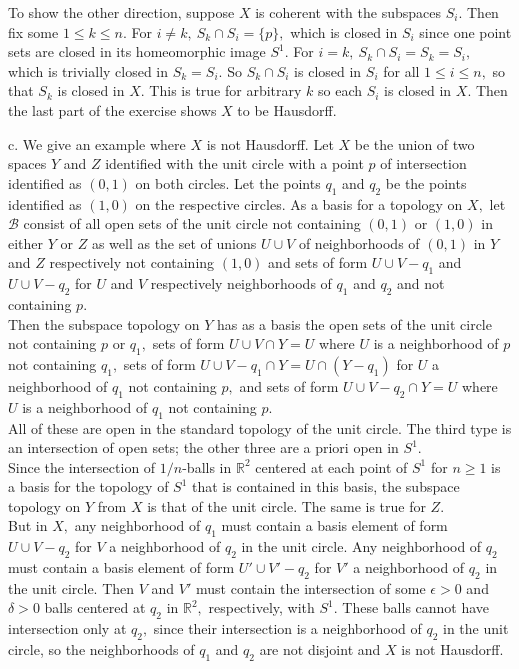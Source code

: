 \documentclass{article}
\begin{document}
To show the other direction, suppose $X$ is coherent with the subspaces $S_i.$  Then fix some $1\le k\le n.$  For $i\ne k,\ S_k\cap S_i=\{p\},$ which is closed in $S_i$ since one point sets are closed in its homeomorphic image $S^1.$  For $i=k,\ S_k\cap S_i=S_k=S_i,$ which is trivially closed in $S_k=S_i.$  So $S_k\cap S_i$ is closed in $S_i$ for all $1\le i\le n,$ so that $S_k$ is closed in $X.$  This is true for arbitrary $k$ so each $S_i$ is closed in $X.$  Then the last part of the exercise shows $X$ to be Hausdorff.

c. We give an example where $X$ is not Hausdorff.
Let $X$ be the union of two spaces $Y$ and $Z$ identified with the unit circle with a point $p$ of intersection identified as $(0,1)$ on both circles.  Let the points $q_1$ and $q_2$ be the points identified as $(1,0)$ on the respective circles.  As a basis for a topology on $X,$ let $\mathscr{B}$ consist of all open sets of the unit circle not containing $(0,1)$ or $(1,0)$ in either $Y$ or $Z$ as well as the set of unions $U\cup V$ of neighborhoods of $(0,1)$ in $Y$ and $Z$ respectively not containing $(1,0)$ and sets of form $U\cup V-q_1$ and $U\cup V-q_2$ for $U$ and $V$ respectively neighborhoods of $q_1$ and $q_2$ and not containing $p.$
\\
Then the subspace topology on $Y$ has as a basis the open sets of the unit circle not containing $p$ or $q_1,$ sets of form $U\cup V\cap Y=U$ where $U$ is a neighborhood of $p$ not containing $q_1,$ sets of form $U\cup V-q_1\cap Y=U\cap(Y-q_1)$ for $U$ a neighborhood of $q_1$ not containing $p,$ and sets of form $U\cup V-q_2\cap Y=U$ where $U$ is a neighborhood of $q_1$ not containing $p.$
\\
All of these are open in the standard topology of the unit circle.  The third type is an intersection of open sets; the other three are a priori open in $S^1.$
\\
Since the intersection of $1/n$-balls in $\mathbb{R}^2$ centered at each point of $S^1$ for $n\ge 1$ is a basis for the topology of $S^1$ that is contained in this basis, the subspace topology on $Y$ from $X$ is that of the unit circle.  The same is true for $Z.$
\\
But in $X,$ any neighborhood of $q_1$ must contain a basis element of form $U\cup V-q_2$ for $V$ a neighborhood of $q_2$ in the unit circle.  Any neighborhood of $q_2$ must contain a basis element of form $U'\cup V'-q_2$ for $V'$ a neighborhood of $q_2$ in the unit circle.  Then $V$ and $V'$ must contain the intersection of some $\epsilon>0$ and $\delta>0$ balls centered at $q_2$ in $\mathbb{R}^2,$ respectively, with $S^1.$  These balls cannot have intersection only at $q_2,$ since their intersection is a neighborhood of $q_2$ in the unit circle, so the neighborhoods of $q_1$ and $q_2$ are not disjoint and $X$ is not Hausdorff.
\end{document}
